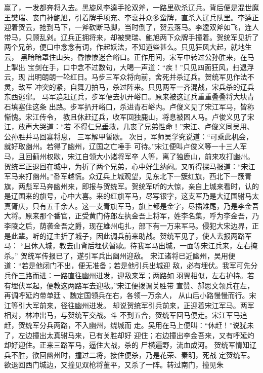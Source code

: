 赢了，一发都奔将入去。黑旋风李逵手抡双斧，一路里砍杀辽兵。背后便是混世魔
王樊瑞、丧门神鲍旭，引着牌手项充、李衮并众多蛮牌，直杀入辽兵队里。李逵正
迎着贺云，抢到马下，一斧砍断马脚，当时倒了，贺云落马。李逵双斧如飞，连人
带马，只顾乱剁。辽兵正拥将来，却被樊瑞、鲍旭两下众牌手撞着。贺统军见折了
两个兄弟，便口中念念有词，作起妖法，不知道些甚么。只见狂风大起，就地生云，
黑暗暗罩住山头，昏惨惨迷合峪口。正作用间，宋军中转过公孙胜来，在马上掣出
宝剑在手，口中念不过数句，大喝一声道：“疾！”只见四面狂风，扫退浮云，现
出明朗朗一轮红日。马步三军众将向前，舍死并杀辽兵。贺统军见作法不灵，敌军
冲突的紧，自舞刀拍马，杀过阵来。只见两军一齐混战，宋兵杀的辽兵东西逃窜。
马军追赶辽兵，步军便去扒开峪口。原来被这辽兵重重叠叠将大块青石填塞住这条
出路。步军扒开峪口，杀进青石峪内。卢俊义见了宋江军马，皆称惭愧。宋江传令，
教且休赶辽兵，收军回独鹿山，将息被困人马。卢俊义见了宋江，放声大哭道：“若
不得仁兄垂救，几丧了兄弟性命！”宋江、卢俊义同吴用、公孙胜并马回寨将息，
三军解甲暂歇。
次日，军师吴学究说道：“可乘此机会，就好取幽州。若得了幽州，辽国之亡唾手
可待。”宋江便叫卢俊义等一十三人军马，且回蓟州权歇，宋江自领大小诸将军卒
人等，离了独鹿山，前来攻打幽州。
贺统军正退回在城中，为折了两个兄弟，心中好生纳闷。又听得探马报道：“宋江
军马来打幽州。”番军越慌。众辽兵上城观望，见东北下一簇红旗，西北下一簇青
旗，两彪军马奔幽州来，即报与贺统军。贺统军听的大惊，亲自上城来看时，认的
是辽国来的旗号，心中大喜。来的红旗军马，尽写银字，这支军乃是大辽国驸马太
真胥庆，只有五千余人。这一支青旗军马，旗上都是金字，尽插雉尾，乃是李金吾
大将。原来那个番官，正受黄门侍郎左执金吾上将军，姓李名集，呼为李金吾，乃
李陵之后，荫袭金吾之爵，现在雄州屯扎，部下有一万来军马。侵犯大宋边界，正
是此辈。听的辽主折了城子，因此调兵前来助战。贺统军见了，使人去报两路军马：
“且休入城，教去山背后埋伏暂歇。待我军马出城，一面等宋江兵来，左右掩杀。”
贺统军传报已了，遂引军兵出幽州迎敌。
宋江诸将已近幽州，吴用便道：“若是他闭门不出，便无准备；若是他引兵出城迎
敌，必有埋伏。我军可先分兵作三路而进：一路直往幽州进发，迎敌来军；两路如
羽翼相似，左右护持。若有埋伏军起，便教这两路军去迎敌。”宋江便拨调关胜带
宣赞、郝思文领兵在左，再调呼延灼带单廷、魏定国领兵在右，各领一万余人，
从山后小路慢慢而行。宋江等引大军前来，径往幽州进发。
却说贺统军引兵前来，正迎着宋江军马。两军相对，林冲出马，与贺统军交战。斗
不到五合，贺统军回马便走。宋江军马追赶，贺统军分兵两路，不入幽州，绕城而
走。吴用在马上便叫：“休赶！”说犹未了，左边撞出太真驸马来，已有关胜却好
迎住；右边撞出李金吾来，又有呼延灼却好迎住。正来三路军马，逼住大战，杀的
尸横遍野，流血成河。
贺统军情知辽兵不胜，欲回幽州时，撞过二将，接住便杀，乃是花荣、秦明，死战
定贺统军。欲退回西门城边，又撞见双枪将董平，又杀了一阵。转过南门，撞见朱
